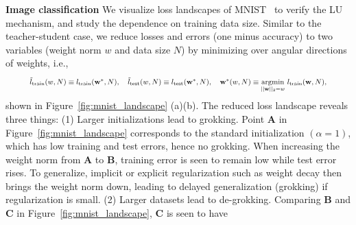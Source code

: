 \documentclass{article} %
\newcommand{\mat}[1]{\mathbf{#1}}
\begin{document}
{\bf Image classification} We visualize loss landscapes of MNIST~\citep{deng2012mnist} to verify the LU mechanism, and study the dependence on training data size. Similar to the teacher-student case, we  reduce losses and errors (one minus accuracy) to two variables (weight norm $w$  and data size $N$) by minimizing over angular directions of weights, i.e.,
\begin{equation}\label{eq:wN}
\resizebox{0.9\textwidth}{!}{$\tilde{l}_{\rm train}(w, N)\equiv l_{\rm train}(\mat{w}^*,N),
\quad \tilde{l}_{\rm test}(w, N)\equiv l_{\rm test}(\mat{w}^*,N),
\quad \mat{w}^*(w,N) \equiv \underset{||\mat{w}||_2=w}{\rm argmin}\ l_{\rm train}(\mat{w}, N),$}
\end{equation} shown in Figure~\ref{fig:mnist_landscape} (a)(b).
The reduced loss landscape reveals three things: (1) Larger initializations lead to grokking. Point {\bf A} in Figure~\ref{fig:mnist_landscape} corresponds to the standard initialization $(\alpha=1)$, which has low training and test errors, hence no grokking. When increasing the weight norm from {\bf A} to {\bf B}, training error is seen to remain low while test error rises. To generalize, implicit or explicit regularization such as weight decay then brings the weight norm down, leading to  delayed generalization (grokking) if regularization is small. (2) Larger datasets lead to de-grokking. Comparing {\bf B} and {\bf C} in Figure~\ref{fig:mnist_landscape}, {\bf C} is seen to have
\end{document}
